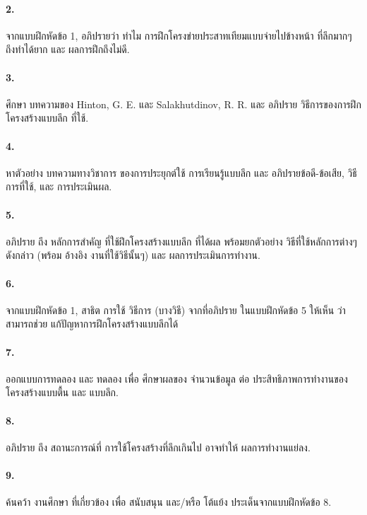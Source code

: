 \paragraph{2.} 
จากแบบฝึกหัดข้อ 1, อภิปรายว่า ทำไม การฝึกโครงข่ายประสาทเทียมแบบจ่ายไปข้างหน้า ที่ลึกมากๆ ถึงทำได้ยาก และ ผลการฝึกถึงไม่ดี.

\paragraph{3.} 
ศึกษา บทความของ Hinton, G. E. และ Salakhutdinov, R. R.\cite{HintonSalakhutdinov2006a} และ อภิปราย วิธีการของการฝึกโครงสร้างแบบลึก ที่ใช้.

\paragraph{4.} 
หาตัวอย่าง บทความทางวิชาการ ของการประยุกต์ใช้ การเรียนรู้แบบลึก และ อภิปรายข้อดี-ข้อเสีย, วิธีการที่ใช้, และ การประเมินผล.

\paragraph{5.} 
อภิปราย ถึง หลักการสำคัญ ที่ใช้ฝึกโครงสร้างแบบลึก ที่ได้ผล พร้อมยกตัวอย่าง วิธีที่ใช้หลักการต่างๆ ดังกล่าว (พร้อม อ้างอิง งานที่ใช้วิธีนั้นๆ) และ ผลการประเมินการทำงาน.

\paragraph{6.} 
จากแบบฝึกหัดข้อ 1, สาธิต การใช้ วิธีการ (บางวิธี) จากที่อภิปราย ในแบบฝึกหัดข้อ 5 ให้เห็น ว่าสามารถช่วย แก้ปัญหาการฝึกโครงสร้างแบบลึกได้

\paragraph{7.} 
ออกแบบการทดลอง และ ทดลอง เพื่อ ศึกษาผลของ จำนวนข้อมูล ต่อ ประสิทธิภาพการทำงานของ โครงสร้างแบบตื้น และ แบบลึก.

\paragraph{8.} 
อภิปราย ถึง สถานะการณ์ที่ การใช้โครงสร้างที่ลึกเกินไป อาจทำให้ ผลการทำงานแย่ลง.

\paragraph{9.} 
ค้นคว้า งานศึกษา ที่เกี่ยวข้อง เพื่อ สนับสนุน และ/หรือ โต้แย้ง ประเด็นจากแบบฝึกหัดข้อ 8.

